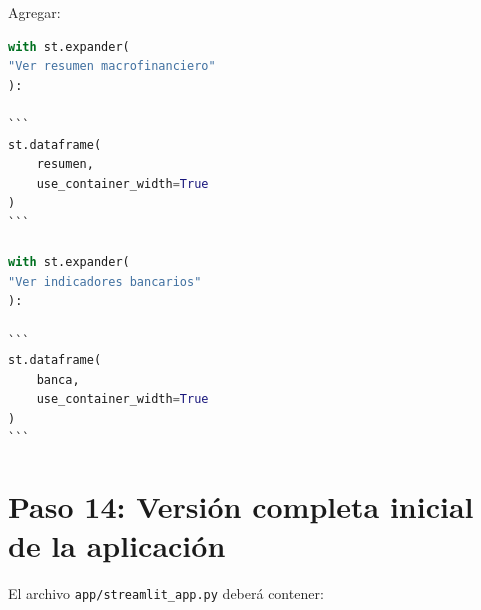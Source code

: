 Agregar:

\begin{lstlisting}[language=Python]
with st.expander(
"Ver resumen macrofinanciero"
):

```
st.dataframe(
    resumen,
    use_container_width=True
)
```

with st.expander(
"Ver indicadores bancarios"
):

```
st.dataframe(
    banca,
    use_container_width=True
)
```

\end{lstlisting}

\section{Paso 14: Versión completa inicial de la aplicación}

El archivo \texttt{app/streamlit_app.py} deberá contener:

